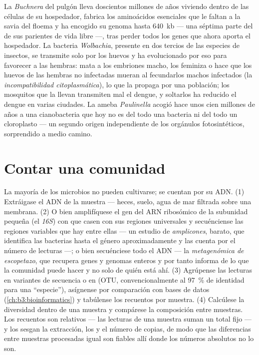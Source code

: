 \begin{example}\label{ex:b3:microbiomes:obligate}
La \emph{Buchnera} del pulgón lleva doscientos millones de años viviendo
dentro de las células de su hospedador, fabrica los aminoácidos
esenciales que le faltan a la savia del floema y ha encogido su genoma
hasta \qty{640}{kb} --- una séptima parte del de sus parientes de vida
libre ---, tras perder todos los genes que ahora aporta el hospedador. La
bacteria \emph{Wolbachia}, presente en dos tercios de las especies de
insectos, se transmite solo por los huevos y ha evolucionado por eso para
favorecer a las hembras: mata a los embriones macho, los feminiza o hace
que los huevos de las hembras no infectadas mueran al fecundarlos machos
infectados (la \emph{incompatibilidad citoplasmática}), lo que la propaga
por una población; los mosquitos que la llevan transmiten mal el dengue,
y soltarlos ha reducido el dengue en varias ciudades. La ameba
\emph{Paulinella} acogió hace unos cien millones de años a una
cianobacteria que hoy no es del todo una bacteria ni del todo un
cloroplasto --- un segundo origen independiente de los orgánulos
fotosintéticos, sorprendido a medio camino.
\end{example}

\section{Contar una comunidad}

\begin{method}\label{met:b3:microbiomes:16s}
La mayoría de los microbios no pueden cultivarse; se cuentan por su ADN.
(1) Extráigase el ADN de la muestra --- heces, suelo, agua de mar filtrada
sobre una membrana. (2) O bien amplifíquese el gen del ARN ribosómico de
la subunidad pequeña (el \emph{16S}) con  que casen con sus
regiones universales y secuénciense las regiones variables que hay entre
ellas --- un estudio de \emph{amplicones}, barato, que identifica las
bacterias hasta el género aproximadamente y las cuenta por el número de
lecturas ---; o bien secuénciese todo el ADN --- la \emph{metagenómica de
escopetazo}, que recupera genes y genomas enteros y por tanto informa de
lo que la comunidad puede hacer y no solo de quién está ahí. (3)
Agrúpense las lecturas en variantes de secuencia o en \emph{} (OTU, convencionalmente al \qty{97}{\%} de
identidad para una ``especie''), asígnense por comparación con bases de
datos (\cref{ch:b3:bioinformatics}) y tabúlense los recuentos por
muestra. (4) Calcúlese la diversidad dentro de una muestra y compárese la
composición entre muestras. Los recuentos son relativos --- las lecturas
de una muestra suman un total fijo --- y los sesgan la extracción, los
 y el número de copias, de modo que las diferencias entre
muestras procesadas igual son fiables allí donde los números absolutos no
lo son.
\end{method}

